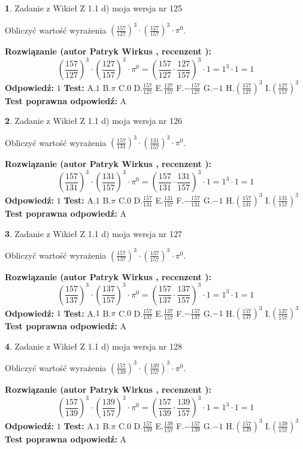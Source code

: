 \documentclass[12pt, a4paper]{article}
\theoremstyle{definition} %
\newtheorem{zad}{}
\newcommand{\zadStart}[1]{\begin{zad}#1\newline}
\newcommand{\zadStop}{\end{zad}}
\newcommand{\rozwStart}[2]{\noindent \textbf{Rozwiązanie (autor #1 , recenzent #2): }\newline}
\newcommand{\rozwStop}{\newline}
\newcommand{\odpStart}{\noindent \textbf{Odpowiedź:}\newline}
\newcommand{\odpStop}{\newline}
\newcommand{\testStart}{\noindent \textbf{Test:}\newline}
\newcommand{\testStop}{\newline}
\newcommand{\kluczStart}{\noindent \textbf{Test poprawna odpowiedź:}\newline}
\newcommand{\kluczStop}{\newline}
\begin{document}
\zadStart{Zadanie z Wikieł Z 1.1 d) moja wersja nr 125}

Obliczyć wartość wyrażenia $(\frac{157}{127})^{3} \cdot (\frac{127}{157})^{3} \cdot \pi^{0}$.
\zadStop
\rozwStart{Patryk Wirkus}{}
$$(\frac{157}{127})^{3} \cdot (\frac{127}{157})^{3} \cdot \pi^{0} = (\frac{157}{127} \cdot \frac{127}{157})^{3} \cdot 1 = 1^{3} \cdot 1 = 1$$
\rozwStop
\odpStart
$1$
\odpStop
\testStart
A.$1$ B.$\pi$ C.$0$ D.$\frac{157}{127}$ E.$\frac{127}{157}$
F.$-\frac{157}{127}$ G.$-1$
H.$(\frac{157}{127})^{3}$
I.$(\frac{127}{157})^{3}$
\testStop
\kluczStart
A
\kluczStop



\zadStart{Zadanie z Wikieł Z 1.1 d) moja wersja nr 126}

Obliczyć wartość wyrażenia $(\frac{157}{131})^{3} \cdot (\frac{131}{157})^{3} \cdot \pi^{0}$.
\zadStop
\rozwStart{Patryk Wirkus}{}
$$(\frac{157}{131})^{3} \cdot (\frac{131}{157})^{3} \cdot \pi^{0} = (\frac{157}{131} \cdot \frac{131}{157})^{3} \cdot 1 = 1^{3} \cdot 1 = 1$$
\rozwStop
\odpStart
$1$
\odpStop
\testStart
A.$1$ B.$\pi$ C.$0$ D.$\frac{157}{131}$ E.$\frac{131}{157}$
F.$-\frac{157}{131}$ G.$-1$
H.$(\frac{157}{131})^{3}$
I.$(\frac{131}{157})^{3}$
\testStop
\kluczStart
A
\kluczStop



\zadStart{Zadanie z Wikieł Z 1.1 d) moja wersja nr 127}

Obliczyć wartość wyrażenia $(\frac{157}{137})^{3} \cdot (\frac{137}{157})^{3} \cdot \pi^{0}$.
\zadStop
\rozwStart{Patryk Wirkus}{}
$$(\frac{157}{137})^{3} \cdot (\frac{137}{157})^{3} \cdot \pi^{0} = (\frac{157}{137} \cdot \frac{137}{157})^{3} \cdot 1 = 1^{3} \cdot 1 = 1$$
\rozwStop
\odpStart
$1$
\odpStop
\testStart
A.$1$ B.$\pi$ C.$0$ D.$\frac{157}{137}$ E.$\frac{137}{157}$
F.$-\frac{157}{137}$ G.$-1$
H.$(\frac{157}{137})^{3}$
I.$(\frac{137}{157})^{3}$
\testStop
\kluczStart
A
\kluczStop



\zadStart{Zadanie z Wikieł Z 1.1 d) moja wersja nr 128}

Obliczyć wartość wyrażenia $(\frac{157}{139})^{3} \cdot (\frac{139}{157})^{3} \cdot \pi^{0}$.
\zadStop
\rozwStart{Patryk Wirkus}{}
$$(\frac{157}{139})^{3} \cdot (\frac{139}{157})^{3} \cdot \pi^{0} = (\frac{157}{139} \cdot \frac{139}{157})^{3} \cdot 1 = 1^{3} \cdot 1 = 1$$
\rozwStop
\odpStart
$1$
\odpStop
\testStart
A.$1$ B.$\pi$ C.$0$ D.$\frac{157}{139}$ E.$\frac{139}{157}$
F.$-\frac{157}{139}$ G.$-1$
H.$(\frac{157}{139})^{3}$
I.$(\frac{139}{157})^{3}$
\testStop
\kluczStart
A
\kluczStop
\end{document}
